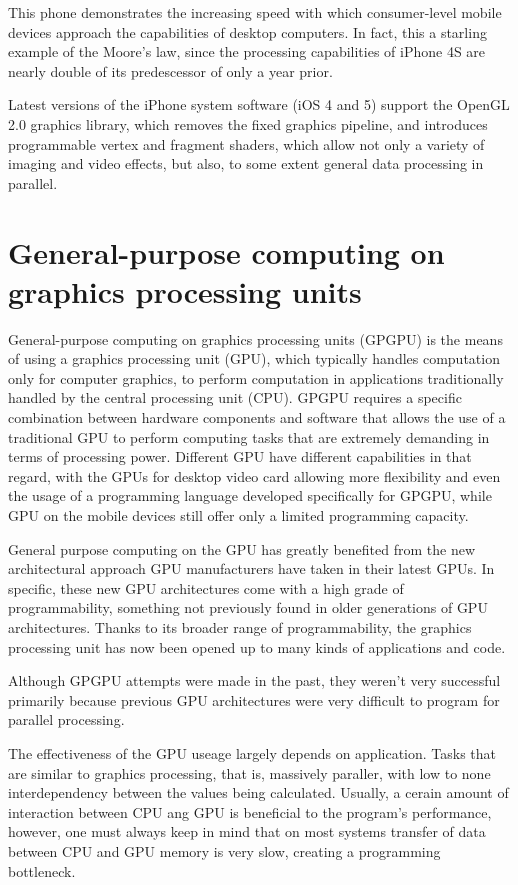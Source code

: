 This phone demonstrates the increasing speed with which consumer-level mobile devices approach the capabilities of desktop computers. In fact, this a starling example of the Moore's law, since the processing capabilities of iPhone 4S are nearly double of its predescessor of only a year prior.

Latest versions of the iPhone system software (iOS 4 and 5) support the OpenGL 2.0 graphics library, which removes the fixed graphics pipeline, and introduces programmable vertex and fragment shaders, which allow not only a variety of imaging and video effects, but also, to some extent general data processing in parallel. 

\section{General-purpose computing on graphics processing units}

General-purpose computing on graphics processing units (GPGPU) is the means of using a graphics processing unit (GPU), which typically handles computation only for computer graphics, to perform computation in applications traditionally handled by the central processing unit (CPU). 
 GPGPU requires a specific combination  between hardware components and software that allows the use of a traditional GPU to perform computing tasks that are extremely demanding in terms of processing power. Different GPU have different capabilities in that regard, with the GPUs for desktop video card allowing more flexibility and even the usage of a programming language developed specifically for GPGPU, while GPU on the mobile devices still offer only a limited programming capacity.  

General purpose computing on the GPU has greatly benefited from the new architectural approach GPU manufacturers have taken in their latest GPUs. In specific, these new GPU architectures come with a high grade of programmability, something not previously found in older generations of GPU architectures. Thanks to its broader range of programmability, the graphics processing unit has now been opened up to many kinds of applications and code.

Although GPGPU attempts were made in the past, they weren't very successful primarily because previous GPU architectures were very difficult to program for parallel processing. 

The effectiveness of the GPU useage largely depends on application. Tasks that are similar to graphics processing, that is, massively paraller, with low to none interdependency between the values being calculated. 
Usually, a cerain amount of interaction between CPU ang GPU is beneficial to the program's performance, however, one must always keep in mind that on most systems transfer of data between CPU and GPU memory is very slow, creating a programming bottleneck. 


